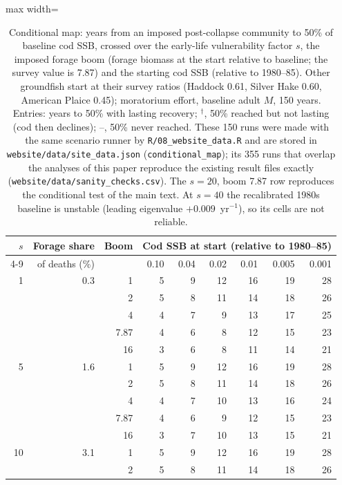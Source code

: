 \documentclass[11pt,letterpaper,fleqn]{article}
\begin{document}
\begin{table}[p]\caption{Conditional map: years from an imposed post-collapse community to 50\% of baseline cod SSB, crossed over the early-life vulnerability factor $s$, the imposed forage boom (forage biomass at the start relative to baseline; the survey value is 7.87) and the starting cod SSB (relative to 1980--85). Other groundfish start at their survey ratios (Haddock 0.61, Silver Hake 0.60, American Plaice 0.45); moratorium effort, baseline adult $M$, 150 years. Entries: years to 50\% with lasting recovery; $^{\dagger}$, 50\% reached but not lasting (cod then declines); --, 50\% never reached. These 150 runs were made with the same scenario runner by \nolinkurl{R/08_website_data.R} and are stored in \nolinkurl{website/data/site_data.json} (\texttt{conditional\_map}); its 355 runs that overlap the analyses of this paper reproduce the existing result files exactly (\nolinkurl{website/data/sanity_checks.csv}). The $s=20$, boom 7.87 row reproduces the conditional test of the main text. At $s=40$ the recalibrated 1980s baseline is unstable (leading eigenvalue $+0.009$~yr$^{-1}$), so its cells are not reliable.}\label{tab:S-condmap}
\centering\small\begin{adjustbox}{max width=\textwidth}\begin{tabular}{@{}rrrrrrrrr@{}}\toprule
$s$ & Forage share & Boom & \multicolumn{6}{c}{Cod SSB at start (relative to 1980--85)}\\\cmidrule(lr){4-9}
 & of deaths (\%) & & 0.10 & 0.04 & 0.02 & 0.01 & 0.005 & 0.001\\\midrule
1 & 0.3 & 1 & 5 & 9 & 12 & 16 & 19 & 28\\
 &  & 2 & 5 & 8 & 11 & 14 & 18 & 26\\
 &  & 4 & 4 & 7 & 9 & 13 & 17 & 25\\
 &  & 7.87 & 4 & 6 & 8 & 12 & 15 & 23\\
 &  & 16 & 3 & 6 & 8 & 11 & 14 & 21\\
\midrule
5 & 1.6 & 1 & 5 & 9 & 12 & 16 & 19 & 28\\
 &  & 2 & 5 & 8 & 11 & 14 & 18 & 26\\
 &  & 4 & 4 & 7 & 10 & 13 & 16 & 24\\
 &  & 7.87 & 4 & 6 & 9 & 12 & 15 & 23\\
 &  & 16 & 3 & 7 & 10 & 13 & 15 & 21\\
\midrule
10 & 3.1 & 1 & 5 & 9 & 12 & 16 & 19 & 28\\
 &  & 2 & 5 & 8 & 11 & 14 & 18 & 26\\

\end{tabular}
\end{adjustbox}
\end{table}
\end{document}
